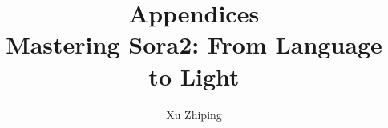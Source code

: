 \documentclass[11pt,letterpaper]{book}
\begin{document}
\title{Appendices\\
\large Mastering Sora2: From Language to Light}
\author{Xu Zhiping}
\date{}
\maketitle

\tableofcontents

\appendix








\printindex
\end{document}
